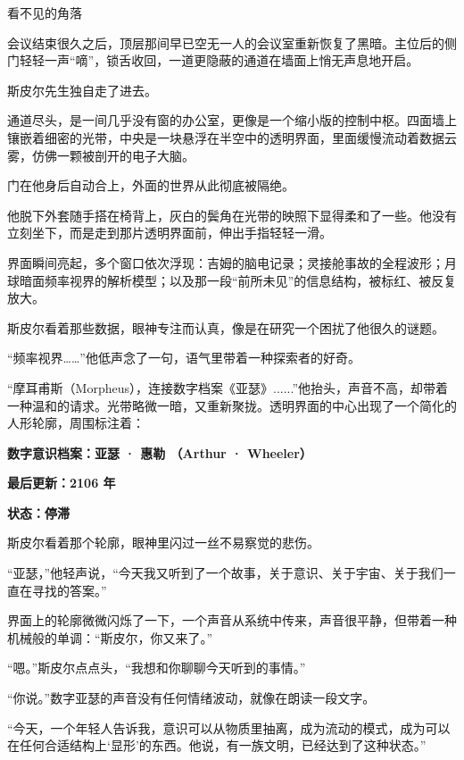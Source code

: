看不见的角落

会议结束很久之后，顶层那间早已空无一人的会议室重新恢复了黑暗。主位后的侧门轻轻一声“嘀”，锁舌收回，一道更隐蔽的通道在墙面上悄无声息地开启。

斯皮尔先生独自走了进去。

通道尽头，是一间几乎没有窗的办公室，更像是一个缩小版的控制中枢。四面墙上镶嵌着细密的光带，中央是一块悬浮在半空中的透明界面，里面缓慢流动着数据云雾，仿佛一颗被剖开的电子大脑。

门在他身后自动合上，外面的世界从此彻底被隔绝。

他脱下外套随手搭在椅背上，灰白的鬓角在光带的映照下显得柔和了一些。他没有立刻坐下，而是走到那片透明界面前，伸出手指轻轻一滑。

界面瞬间亮起，多个窗口依次浮现：吉姆的脑电记录；灵接舱事故的全程波形；月球暗面频率视界的解析模型；以及那一段“前所未见”的信息结构，被标红、被反复放大。

斯皮尔看着那些数据，眼神专注而认真，像是在研究一个困扰了他很久的谜题。

“频率视界……”他低声念了一句，语气里带着一种探索者的好奇。

“摩耳甫斯（Morpheus），连接数字档案《亚瑟》......”他抬头，声音不高，却带着一种温和的请求。光带略微一暗，又重新聚拢。透明界面的中心出现了一个简化的人形轮廓，周围标注着：

\begin{center}
\textbf{数字意识档案：亚瑟 · 惠勒 （Arthur · Wheeler）}
\end{center}

\begin{center}
\textbf{最后更新：2106 年}
\end{center}

\begin{center}
\textbf{状态：停滞}
\end{center}

斯皮尔看着那个轮廓，眼神里闪过一丝不易察觉的悲伤。

“亚瑟，”他轻声说，“今天我又听到了一个故事，关于意识、关于宇宙、关于我们一直在寻找的答案。”

界面上的轮廓微微闪烁了一下，一个声音从系统中传来，声音很平静，但带着一种机械般的单调：“斯皮尔，你又来了。”

“嗯。”斯皮尔点点头，“我想和你聊聊今天听到的事情。”

“你说。”数字亚瑟的声音没有任何情绪波动，就像在朗读一段文字。

“今天，一个年轻人告诉我，意识可以从物质里抽离，成为流动的模式，成为可以在任何合适结构上‘显形’的东西。他说，有一族文明，已经达到了这种状态。”

